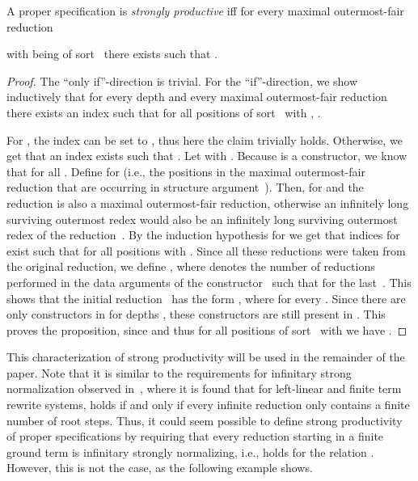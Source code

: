 \documentclass{eptcs}
\begin{document}
\begin{proposition}
\label{prop:NonOrthoProd}
A proper specification  is
\emph{strongly productive} iff for every maximal outermost-fair reduction

with  being of sort~ there exists  such that
.
\end{proposition}

\begin{proof}
The ``only if''-direction is trivial. For the ``if''-direction, we show
inductively that for every depth  and every maximal outermost-fair
reduction  there exists an index
 such that for all positions  of sort~ with
, .

For , the index  can be set to , thus here the claim trivially
holds.
Otherwise, we get that an index  exists such that
. Let  with
.
Because  is a constructor, we know that  for all .
Define  for  (i.e.,
the positions in the maximal outermost-fair reduction that are occurring in
structure argument~).
Then, for  and  the
reduction  is also a
maximal outermost-fair reduction, otherwise an infinitely long surviving
outermost redex would also be an infinitely long surviving outermost redex of
the reduction~. By the induction hypothesis for  we get
that indices  for  exist such that
 for all positions  with
. Since all these reductions were taken from the original reduction,
we define ,
where  denotes the number of reductions performed in the
data arguments of the constructor~ such that  for the
last~.
This shows that the initial reduction~ has the form
,
where  for every . Since there are only
constructors in  for depths , these constructors are
still present in . This proves the proposition, since  and
thus for all positions  of sort~ with  we have
.
\end{proof}


This characterization of strong productivity will be used in the remainder of
the paper. Note that it is similar to the requirements for infinitary strong
normalization  observed in~\cite{Z08}, where it is found that for
left-linear and finite term rewrite systems,  holds if and only if every
infinite reduction only contains a finite number of root steps. Thus, it could
seem possible to define strong productivity of proper specifications by
requiring that every reduction starting in a finite ground term is infinitary
strongly normalizing, i.e.,  holds for the relation
.
However, this is not the case, as the following example shows.
\end{document}
